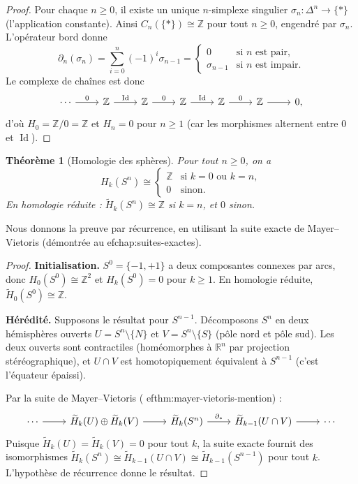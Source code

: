 \documentclass[12pt,a4paper,openany]{book}
\theoremstyle{definition}
\theoremstyle{plain}
\newtheorem{theoreme}[definition]{Théorème}
\theoremstyle{remark}
\newcommand{\Z}{\mathbb{Z}}
\newcommand{\R}{\mathbb{R}}
\DeclareMathOperator{\Id}{Id}
\begin{document}
\begin{proof}
Pour chaque $n \geq 0$, il existe un unique $n$-simplexe singulier $\sigma_n \colon \Delta^n \to \{*\}$
(l'application constante). Ainsi $C_n(\{*\}) \cong \Z$ pour tout $n \geq 0$, engendré par $\sigma_n$.
L'opérateur bord donne
\[
  \partial_n(\sigma_n) = \sum_{i=0}^{n} (-1)^i \sigma_{n-1} = \begin{cases} 0 & \text{si $n$ est pair,} \\ \sigma_{n-1} & \text{si $n$ est impair.} \end{cases}
\]
Le complexe de chaînes est donc
\[
\begin{tikzcd}
  \cdots \ar[r, "0"] & \Z \ar[r, "\Id"] & \Z \ar[r, "0"] & \Z \ar[r, "\Id"] & \Z \ar[r, "0"] & \Z \ar[r] & 0,
\end{tikzcd}
\]
d'où $H_0 = \Z/0 = \Z$ et $H_n = 0$ pour $n \geq 1$ (car les morphismes alternent entre $0$ et $\Id$).
\end{proof}

\begin{theoreme}[Homologie des sphères]\label{thm:homologie-spheres}
Pour tout $n \geq 0$, on a
\[
  H_k(S^n) \cong \begin{cases} \Z & \text{si } k = 0 \text{ ou } k = n, \\ 0 & \text{sinon.} \end{cases}
\]
En homologie réduite : $\widetilde{H}_k(S^n) \cong \Z$ si $k = n$, et $0$ sinon.
\end{theoreme}

Nous donnons la preuve par récurrence, en utilisant la suite exacte de Mayer--Vietoris
(démontrée au 
ef{chap:suites-exactes}).

\begin{proof}
\textbf{Initialisation.} $S^0 = \{-1, +1\}$ a deux composantes connexes par arcs, donc
$H_0(S^0) \cong \Z^2$ et $H_k(S^0) = 0$ pour $k \geq 1$. En homologie réduite, $\widetilde{H}_0(S^0) \cong \Z$.

\textbf{Hérédité.} Supposons le résultat pour $S^{n-1}$. Décomposons $S^n$ en deux hémisphères
ouverts $U = S^n \setminus \{N\}$ et $V = S^n \setminus \{S\}$ (pôle nord et pôle sud).
Les deux ouverts sont contractiles (homéomorphes à $\R^n$ par projection stéréographique),
et $U \cap V$ est homotopiquement équivalent à $S^{n-1}$ (c'est l'équateur épaissi).

Par la suite de Mayer--Vietoris (
ef{thm:mayer-vietoris-mention}) :
\[
\begin{tikzcd}
  \cdots \ar[r] & \widetilde{H}_k(U) \oplus \widetilde{H}_k(V) \ar[r] & \widetilde{H}_k(S^n) \ar[r, "\partial_*"] & \widetilde{H}_{k-1}(U \cap V) \ar[r] & \cdots
\end{tikzcd}
\]
Puisque $\widetilde{H}_k(U) = \widetilde{H}_k(V) = 0$ pour tout $k$, la suite exacte fournit
des isomorphismes $\widetilde{H}_k(S^n) \cong \widetilde{H}_{k-1}(U \cap V) \cong \widetilde{H}_{k-1}(S^{n-1})$
pour tout $k$. L'hypothèse de récurrence donne le résultat.
\end{proof}
\end{document}
